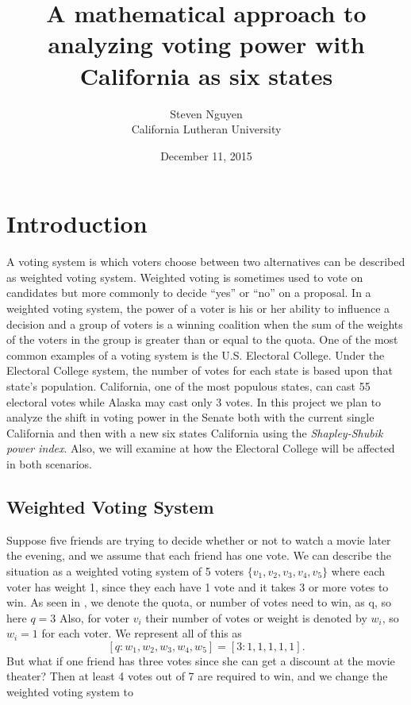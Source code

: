 \documentclass[12pt]{article}
\begin{document}
\title{A mathematical approach to analyzing voting power with California as six states}
\author{Steven Nguyen\\
California Lutheran University}
\date{December 11, 2015}
\maketitle
\newpage

\section{Introduction}
A voting system is which voters choose between two alternatives can 
be described as weighted voting system. Weighted voting is sometimes used to vote on candidates but more commonly to decide “yes” or “no” on a proposal. In a weighted voting system, the power of a voter is his or her ability to influence a decision and a group of voters is a winning coalition when the sum of the weights of the voters in the group is greater than or equal to the quota.
One of the most common examples of a voting system is the U.S. Electoral College. Under the Electoral College system, the number of votes for each state is based upon that state's population. California, one of the most populous states, can cast 55 electoral votes while Alaska may cast only 3 votes. In this project we plan to analyze the shift in voting power in the Senate both with the current single California and then with a new six states California using the \textit{Shapley-Shubik power index}. Also, we will examine at how the Electoral College will be affected in both scenarios.    


\subsection{Weighted Voting System}
Suppose five friends are trying to decide whether or not to watch a movie later the evening, and we assume that each friend has one vote. We can describe the situation as a weighted voting system of 5 voters ${\{v_1,v_2,v_3,v_4,v_5\}}$ where each voter has weight 1, since they each have 1 vote and it takes 3 or more votes to win. As seen in \cite{M}, we denote the quota, or number of votes need to win, as q, so here $q=3$ Also, for voter $v_i$ their number of votes or weight is denoted by $w_i$, so $w_i =1$ for each voter. We represent all of this as $$[q:w_1,w_2,w_3,w_4,w_5] = [3:1,1,1,1,1].$$ But what if one friend has three votes since she can get a discount at the movie theater? Then at least 4 votes out of 7 are required to win, and we change the weighted voting system to 
\end{document}
